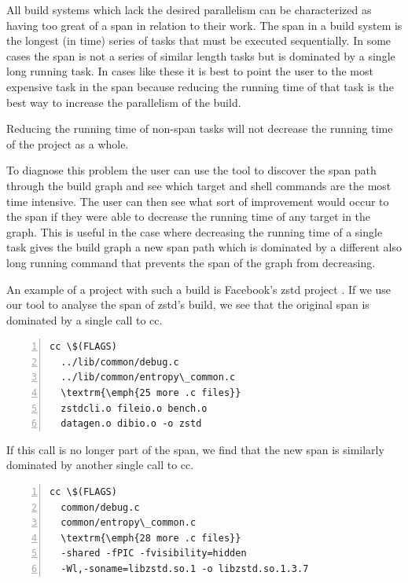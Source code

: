 \documentclass[sigplan,10pt,review,authorversion]{acmart}\settopmatter{printfolios=true,printccs=false,printacmref=false}
\begin{document}
All build systems which lack the desired parallelism can be characterized as having too great of
a span in relation to their work.  The span in a build system is the longest (in time) series of
tasks that must be executed sequentially.  In some cases the span is not a series of similar length
tasks but is dominated by a single long running task.  In cases like these it is best to point the
user to the most expensive task in the span because reducing the running time of that task is the
best way to increase the parallelism of the build.

Reducing the running time of non-span tasks will not decrease the running time of the project as
a whole.

To diagnose this problem the user can use the tool to discover the span path through the build
graph and see which target and shell commands are the most time intensive.  The user can then see
what sort of improvement would occur to the span if they were able to decrease the running
time of any target in the graph.  This is useful in the case where decreasing the running time
of a single task gives the build graph a new span path which is dominated by a different also
long running command that prevents the span of the graph from decreasing.

An example of a project with such a build is Facebook's zstd project \cite{}.  If we use our tool
to analyse the span of zstd's build, we see that the original span is dominated by a single call
to cc.

\begin{Verbatim}[commandchars=\\\{\},codes={\catcode`$=3\catcode`^=7\catcode`_=8},fontsize=\small,numbers=left,xleftmargin=5mm]
  cc \$(FLAGS)
  ../lib/common/debug.c
  ../lib/common/entropy\_common.c
  \textrm{\emph{25 more .c files}}
  zstdcli.o fileio.o bench.o
  datagen.o dibio.o -o zstd
\end{Verbatim}

If this call is no longer part of the span, we find that the new span is similarly dominated by
another single call to cc.

\begin{Verbatim}[commandchars=\\\{\},codes={\catcode`$=3\catcode`^=7\catcode`_=8},fontsize=\small,numbers=left,xleftmargin=5mm]
  cc \$(FLAGS)
  common/debug.c
  common/entropy\_common.c
  \textrm{\emph{28 more .c files}}
  -shared -fPIC -fvisibility=hidden
  -Wl,-soname=libzstd.so.1 -o libzstd.so.1.3.7
\end{Verbatim}
\end{document}

